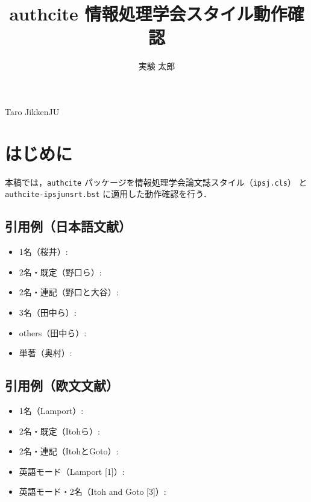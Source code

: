 \documentclass[submit]{ipsj}
\begin{document}
\title{authcite 情報処理学会スタイル動作確認}

\author{実験 太郎}{Taro Jikken}{JU}
\maketitle

\section{はじめに}
本稿では，\texttt{authcite} パッケージを情報処理学会論文誌スタイル（\texttt{ipsj.cls}）
と \texttt{authcite-ipsjunsrt.bst} に適用した動作確認を行う．

\subsection{引用例（日本語文献）}
\begin{itemize}
  \item 1名（桜井）: 
  \item 2名・既定（野口ら）: 
  \item 2名・連記（野口と大谷）: 
  \item 3名（田中ら）: 
  \item others（田中ら）: 
  \item 単著（奥村）: 
\end{itemize}

\subsection{引用例（欧文文献）}
\begin{itemize}
  \item 1名（Lamport）: 
  \item 2名・既定（Itohら）: 
  \item 2名・連記（ItohとGoto）: 
  \item 英語モード（Lamport [1]）: 
  \item 英語モード・2名（Itoh and Goto [3]）: 
\end{itemize}



\end{document}
